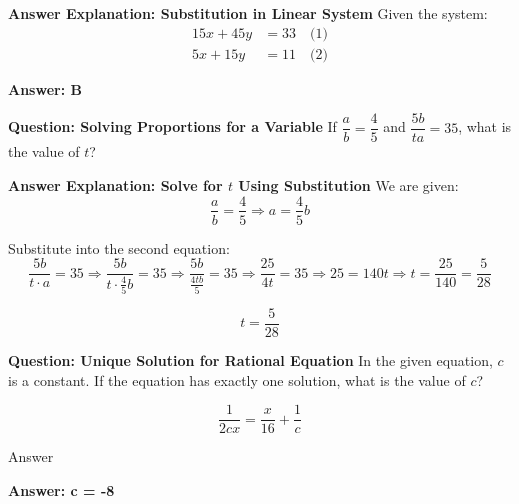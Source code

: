 \documentclass{beamer}
\begin{document}
\begin{frame}{\textbf{Answer Explanation: Substitution in Linear System}}
\small
Given the system:
\[
\begin{aligned}
15x + 45y &= 33 \quad \text{(1)} \\
5x + 15y &= 11 \quad \text{(2)}
\end{aligned}
\]


\vspace{5mm}

\textbf{Answer: B}
\end{frame}


\begin{frame}{\textbf{Question: Solving Proportions for a Variable}}
\small
If $\dfrac{a}{b} = \dfrac{4}{5}$ and $\dfrac{5b}{ta} = 35$, what is the value of $t$?
\end{frame}


\begin{frame}{\textbf{Answer Explanation: Solve for $t$ Using Substitution}}
\small
We are given:
\[
\frac{a}{b} = \frac{4}{5} \Rightarrow a = \frac{4}{5}b
\]

Substitute into the second equation:
\[
\frac{5b}{t \cdot a} = 35
\Rightarrow \frac{5b}{t \cdot \frac{4}{5}b} = 35
\Rightarrow \frac{5b}{\frac{4tb}{5}} = 35
\Rightarrow \frac{25}{4t} = 35
\Rightarrow 25 = 140t
\Rightarrow t = \frac{25}{140} = \frac{5}{28}
\]

\[
\boxed{t = \frac{5}{28}}
\]
\end{frame}

\begin{frame}{\textbf{Question: Unique Solution for Rational Equation}}
\small
In the given equation, $c$ is a constant. If the equation has exactly one solution, what is the value of $c$?

\[
\frac{1}{2cx} = \frac{x}{16} + \frac{1}{c}
\]
\end{frame}

\begin{frame}{Answer}

\textbf{ Answer: c = -8}
    
\end{frame}
\end{document}
